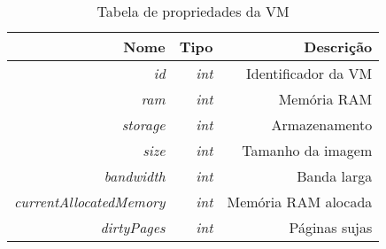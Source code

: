 \begin{table}[!htb]
    \centering
    \caption[Representação da VM]{Tabela de propriedades da VM
    \label{tab:vm-shape}}
    \begin{tabular}{rrr}
        \toprule
            Nome & Tipo & Descrição \\ 
        \midrule
            \textit{id} & \textit{int} & Identificador da VM \\
            \textit{ram} & \textit{int} & Memória RAM \\
            \textit{storage} & \textit{int} & Armazenamento \\
            \textit{size} & \textit{int} & Tamanho da imagem \\
            \textit{bandwidth} & \textit{int} & Banda larga \\
            \textit{currentAllocatedMemory} & \textit{int} & Memória RAM alocada \\
            \textit{dirtyPages} & \textit{int} & Páginas sujas \\
        \bottomrule
    \end{tabular}
\end{table}


